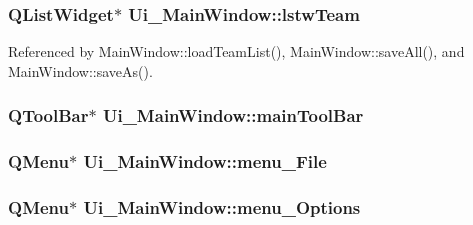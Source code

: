 \subsubsection[{lstw\+Team}]{\setlength{\rightskip}{0pt plus 5cm}Q\+List\+Widget$\ast$ Ui\+\_\+\+Main\+Window\+::lstw\+Team}\label{class_ui___main_window_a18474f46054d16d420125e914595bf3a}


Referenced by Main\+Window\+::load\+Team\+List(), Main\+Window\+::save\+All(), and Main\+Window\+::save\+As().

\hypertarget{class_ui___main_window_a5172877001c8c7b4e0f6de50421867d1}{}
\subsubsection[{main\+Tool\+Bar}]{\setlength{\rightskip}{0pt plus 5cm}Q\+Tool\+Bar$\ast$ Ui\+\_\+\+Main\+Window\+::main\+Tool\+Bar}\label{class_ui___main_window_a5172877001c8c7b4e0f6de50421867d1}
\hypertarget{class_ui___main_window_a6d6a92a6bccde97ab13fce9014eb25d4}{}
\subsubsection[{menu\+\_\+\+File}]{\setlength{\rightskip}{0pt plus 5cm}Q\+Menu$\ast$ Ui\+\_\+\+Main\+Window\+::menu\+\_\+\+File}\label{class_ui___main_window_a6d6a92a6bccde97ab13fce9014eb25d4}
\hypertarget{class_ui___main_window_a652e71e64e3b3dbf31b4fa1000b50064}{}
\subsubsection[{menu\+\_\+\+Options}]{\setlength{\rightskip}{0pt plus 5cm}Q\+Menu$\ast$ Ui\+\_\+\+Main\+Window\+::menu\+\_\+\+Options}\label{class_ui___main_window_a652e71e64e3b3dbf31b4fa1000b50064}
\hypertarget{class_ui___main_window_a4385d24e8bb92bc5cd776c92d7f16439}{}
